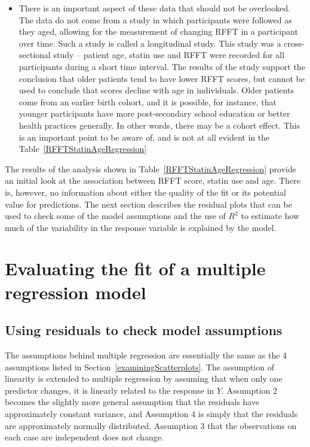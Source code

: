 \begin{itemize}
  \item There is an important aspect of these data that should not be overlooked.  The data do not come from a study in which participants were followed as they aged, allowing for the measurement of changing RFFT in a participant over time. Such a study is called a longitudinal study.  This study was a cross-sectional study -- patient age, statin use and RFFT were recorded for all participants during a short time interval.  The results of the study support the conclusion that older patients tend to have lower RFFT scores, but cannot be used to conclude that scores decline with age in individuals.  Older patients come from an earlier birth cohort, and it is possible, for instance, that younger participants have more post-secondary school education or better health practices generally.  In other words, there may be a cohort effect.  This is an important point to be aware of, and is not at all evident in the Table~\ref{RFFTStatinAgeRegression}
  
 \end{itemize}
 
 
The results of the analysis shown in Table~\ref{RFFTStatinAgeRegression} provide an initial look at the association between RFFT score, statin use and age. There is, however, no information about either the quality of the fit or its potential value for predictions. The next section describes the residual plots that can be used to check some of the model assumptions and the use of $R^2$ to estimate how much of the variability in the response variable is explained by the model.

\section{Evaluating the fit of a multiple regression model}

\subsection{Using residuals to check model assumptions}

The assumptions behind multiple regression are essentially the same as the 4 assumptions listed in Section~\ref{examiningScatterplots}.  The assumption of linearity is extended to multiple regression by assuming that when only one predictor changes, it is linearly related to the response in $Y$.  Assumption 2 becomes the slightly more general assumption that the residuals have approximately constant variance, and Assumption 4 is simply that the residuals are approximately normally distributed. Assumption 3 that the observations on each case are independent does not change. 

